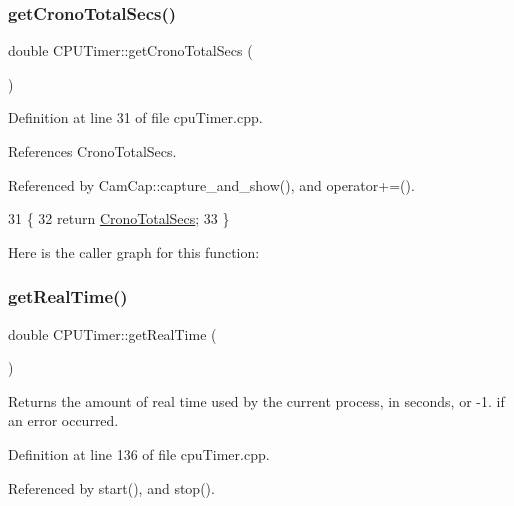 \subsubsection{\texorpdfstring{get\+Crono\+Total\+Secs()}{getCronoTotalSecs()}}
{\footnotesize\ttfamily double C\+P\+U\+Timer\+::get\+Crono\+Total\+Secs (\begin{DoxyParamCaption}{ }\end{DoxyParamCaption})}



Definition at line 31 of file cpu\+Timer.\+cpp.



References Crono\+Total\+Secs.



Referenced by Cam\+Cap\+::capture\+\_\+and\+\_\+show(), and operator+=().


\begin{DoxyCode}
31                                    \{
32     \textcolor{keywordflow}{return} \hyperlink{class_c_p_u_timer_a9c8ac2ee9f44e8b4365321698cf17493}{CronoTotalSecs};
33 \}
\end{DoxyCode}
Here is the caller graph for this function\+:
\mbox{\label{class_c_p_u_timer_a57da0f833904f3ddf20a640e0f8fe127}} 
\subsubsection{\texorpdfstring{get\+Real\+Time()}{getRealTime()}}
{\footnotesize\ttfamily double C\+P\+U\+Timer\+::get\+Real\+Time (\begin{DoxyParamCaption}{ }\end{DoxyParamCaption})\hspace{0.3cm}{\ttfamily [private]}}

Returns the amount of real time used by the current process, in seconds, or -\/1. if an error occurred. 

Definition at line 136 of file cpu\+Timer.\+cpp.



Referenced by start(), and stop().


